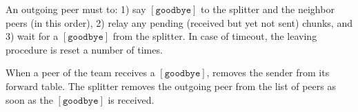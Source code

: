 
\label{sec:leaving}

An outgoing peer must to: 1) say $[\mathtt{goodbye}]$ to the splitter
and the neighbor peers (in this order), 2) relay any pending
(received but yet not sent) chunks, and 3) wait for a
$[\mathtt{goodbye}]$ from the splitter. In case of timeout, the
leaving procedure is reset a number of times.

When a peer of the team receives a $[\mathtt{goodbye}]$, removes the
sender from its $\text{forward}$ table. The splitter removes the
outgoing peer from the list of peers as soon as the
$[\mathtt{goodbye}]$ is received.


\begin{comment}
\begin{figure*}
  \fig{400}{4cm}{leaving}
  \caption{Leaving a team.\label{fig:leaving}}
\end{figure*}

All these rules have been describen in Fig.~\ref{fig:leaving}.
\end{comment}

\begin{comment}
An outgoing peer $P_o$ (see Fig.~\ref{fig:leaving}) must to: (1) say
$[\mathtt{goodbye}]$ to $S$ and to $T^o$ (in this order), (2)
relay any pending (received but yet not sent) chunks, and (3) wait for
a $[\mathtt{goodbye}]$ from $S$, which performs $T = T \setminus
P_o$. In case of a timeout, $P_o$ resets the leaving procedure,
for a maximum number of times.

When a $P_k$ receives a $[\mathtt{goodbye}]$ from $P_o$, $P_k$
removes $P_o$ from its neighbors set, by running $T^k = T^k
\setminus P_o$.
\end{comment}
